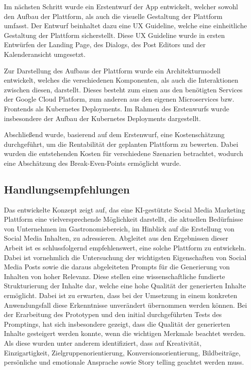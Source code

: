 Im nächsten Schritt wurde ein Erstentwurf der App entwickelt, welcher sowohl den Aufbau der Plattform, als auch die visuelle Gestaltung der Plattform umfasst.
Der Entwurf beinhaltet dazu eine UX Guideline, welche eine einheitliche Gestaltung der Plattform sicherstellt.
Diese UX Guideline wurde in ersten Entwürfen der Landing Page, des Dialogs, des Post Editors und der Kalenderansicht umgesetzt.

Zur Darstellung des Aufbaus der Plattform wurde ein Architekturmodell entwickelt, welches die verschiedenen Komponenten, als auch die Interaktionen zwischen diesen, darstellt.
Dieses besteht zum einen aus den benötigten Services der Google Cloud Platform, zum anderen aus den eigenen Microservices bzw. Frontends als Kubernetes Deployments.
Im Rahmen des Erstenwurfs wurde insbesondere der Aufbau der Kubernetes Deployments dargestellt.

Abschließend wurde, basierend auf dem Erstenwurf, eine Kostenschätzung durchgeführt, um die Rentabilität der geplanten Plattform zu bewerten.
Dabei wurden die entstehenden Kosten für verschiedene Szenarien betrachtet, wodurch eine Abschätzung des Break-Even-Points ermöglicht wurde.

\subsection{Handlungsempfehlungen}

Das entwickelte Konzept zeigt auf, das eine KI-gestützte Social Media Marketing Plattform eine vielversprechende Möglichkeit darstellt, die aktuellen Bedürfnisse von Unternehmen im Gastronomiebereich, im Hinblick auf die Erstellung von Social Media Inhalten, zu adressieren.
Abgleitet aus den Ergebnissen dieser Arbeit ist es schlussfolgernd empfehlenswert, eine solche Plattform zu entwickeln.
Dabei ist vornehmlich die Untersuchung der wichtigsten Eigenschaften von Social Media Posts sowie die daraus abgeleiteten Prompts für die Generierung von Inhalten von hoher Relevanz.
Diese stellen eine wissenschaftliche fundierte Strukturierung der Inhalte dar, welche eine hohe Qualität der generierten Inhalte ermöglicht.
Dabei ist zu erwarten, dass bei der Umsetzung in einem konkreten Anwendungsfall diese Erkenntnisse unverändert übernommen werden können.
Bei der Erarbeitung des Prototypen und den initial durchgeführten Tests des Promptings, hat sich insbesondere gezeigt, dass die Qualität der generierten Inhalte gesteigert werden konnte, wenn die wichtigen Merkmale beachtet werden.
Als diese wurden unter anderem identifiziert, dass auf Kreativität, Einzigartigkeit, Zielgruppenorientierung, Konversionsorientierung, Bildbeiträge, persönliche und emotionale Ansprache sowie Story telling geachtet werden muss.

